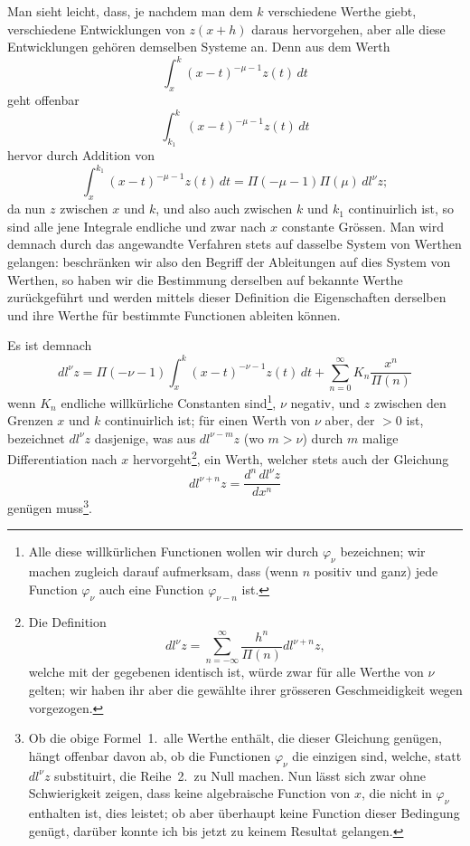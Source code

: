 \documentclass[12pt,a4paper]{article}
\begin{document}
Man sieht leicht, dass, je nachdem man dem $k$ verschiedene Werthe giebt, verschiedene Entwicklungen von $z(x+h)$ daraus hervorgehen, aber alle diese Entwicklungen geh\"oren demselben Systeme an. Denn aus dem Werth
\[
\int_x^k (x-t)^{-\mu-1}z(t)\,dt
\]
geht offenbar
\[
\int_{k_1}^k (x-t)^{-\mu-1}z(t)\,dt
\]
hervor durch Addition von
\[
\int_x^{k_1} (x-t)^{-\mu-1}z(t)\,dt = \Pi(-\mu-1)\Pi(\mu)\,dl^\nu z;
\]
da nun $z$ zwischen $x$ und $k$, und also auch zwischen $k$ und $k_1$ continuirlich ist, so sind alle jene Integrale endliche und zwar nach $x$ constante Gr\"ossen. Man wird demnach durch das angewandte Verfahren stets auf dasselbe System von Werthen gelangen: beschr\"anken wir also den Begriff der Ableitungen auf dies System von Werthen, so haben wir die Bestimmung derselben auf bekannte Werthe zur\"uckgef\"uhrt und werden mittels dieser Definition die Eigenschaften derselben und ihre Werthe f\"ur bestimmte Functionen ableiten k\"onnen.

Es ist demnach
\begin{equation}
dl^\nu z = \Pi(-\nu-1) \int_x^k (x-t)^{-\nu-1}z(t)\,dt + \sum_{n=0}^{\infty} K_n \frac{x^n}{\Pi(n)}
\end{equation}
wenn $K_n$ endliche willk\"urliche Constanten sind\footnote{Alle diese willk\"urlichen Functionen wollen wir durch $\varphi_\nu$ bezeichnen; wir machen zugleich darauf aufmerksam, dass (wenn $n$ positiv und ganz) jede Function $\varphi_\nu$ auch eine Function $\varphi_{\nu-n}$ ist.}, $\nu$ negativ, und $z$ zwischen den Grenzen $x$ und $k$ continuirlich ist; f\"ur einen Werth von $\nu$ aber, der $>0$ ist, bezeichnet $dl^\nu z$ dasjenige, was aus $dl^{\nu-m}z$ (wo $m>\nu$) durch $m$ malige Differentiation nach $x$ hervorgeht\footnote{Die Definition
\[
dl^\nu z = \sum_{n=-\infty}^{\infty} \frac{h^n}{\Pi(n)}dl^{\nu+n}z,
\]
welche mit der gegebenen identisch ist, w\"urde zwar f\"ur alle Werthe von $\nu$ gelten; wir haben ihr aber die gew\"ahlte ihrer gr\"osseren Geschmeidigkeit wegen vorgezogen.}, ein Werth, welcher stets auch der Gleichung
\[
dl^{\nu+n}z = \frac{d^n\,dl^\nu z}{dx^n}
\]
gen\"ugen muss\footnote{Ob die obige Formel~1.\ alle Werthe enth\"alt, die dieser Gleichung gen\"ugen, h\"angt offenbar davon ab, ob die Functionen $\varphi_\nu$ die einzigen sind, welche, statt $dl^\nu z$ substituirt, die Reihe~2.\ zu Null machen. Nun l\"asst sich zwar ohne Schwierigkeit zeigen, dass keine algebraische Function von $x$, die nicht in $\varphi_\nu$ enthalten ist, dies leistet; ob aber \"uberhaupt keine Function dieser Bedingung gen\"ugt, dar\"uber konnte ich bis jetzt zu keinem Resultat gelangen.}.
\end{document}
